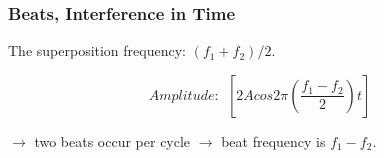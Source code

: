 \documentclass[]{beamer}
\begin{document}
  
  
  
  \begin{frame}
  \frametitle{Beats, Interference in Time}
  
  
   The superposition frequency: $(f_1+ f_ 2)/2$.
  
  \pause
  \vspace{3mm}
  

   \begin{equation}
    Amplitude:  ~~ \left[2Acos2\pi\left(\frac{f_1-f_2}{2}\right)t\right] 
    \end{equation}

  

  \pause
  \vspace{3mm}
  
  $ \rightarrow$ two beats occur per cycle \pause $\rightarrow$ beat frequency is $f_1-f_2$.
  
  
    \end{frame}
  
  

    



 
\end{document}
